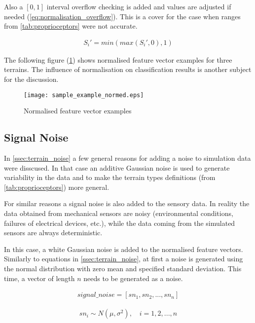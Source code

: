 Also a $ [0, 1] $ interval overflow checking is added and values are adjusted if needed (\cref{eq:normalisation_overflow}). This is a cover for the case when ranges from \cref{tab:proprioceptors} were not accurate.

\begin{align} \label{eq:normalisation_overflow}
S_i' = min(max(S_i', 0), 1)
\end{align}

The following figure (\ref{fig:sample_example_normed}) shows normalised feature vector examples for three terrains. The influence of normalisation on classification results is another subject for the discussion.

\begin{figure}[H]
  \centering
  \texttt{[image: sample\_example\_normed.eps]}
  \caption{Normalised feature vector examples}
  \label{fig:sample_example_normed}
\end{figure}

\subsection{Signal Noise} \label{ssec:signal_noise}
In \cref{ssec:terrain_noise} a few general reasons for adding a noise to simulation data were disscused. In that case an additive Gaussian noise is used to generate variability in the data and to make the terrain types definitions (from \cref{tab:proprioceptors}) more general.

For similar reasons a signal noise is also added to the sensory data. In reality the data obtained from mechanical sensors are noisy (environmental conditions, failures of electrical devices, etc.), while the data coming from the simulated sensors are always deterministic.

In this case, a white Gaussian noise is added to the normalised feature vectors. Similarly to equations in \cref{ssec:terrain_noise}, at first a noise is generated using the normal distribution with zero mean and specified standard deviation. This time, a vector of length $ n $ needs to be generated as a noise.

\begin{align}
signal\_noise = [sn_1, sn_2, ..., sn_n]
\end{align}

\begin{align}
sn_i \sim N(\mu, \sigma^2), \quad i = 1, 2, ..., n
\end{align}

